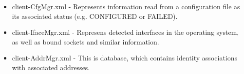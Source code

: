\begin{itemize}
\item client-CfgMgr.xml - Represents information read from a
  configuration file as its associated status (e.g. CONFIGURED or
  FAILED).
\item client-IfaceMgr.xml - Represens detected interfaces in the
  operating system, as well as bound sockets and similar information.
\item client-AddrMgr.xml - This is database, which contains identity
  associations with associated addresses.
\end{itemize}
